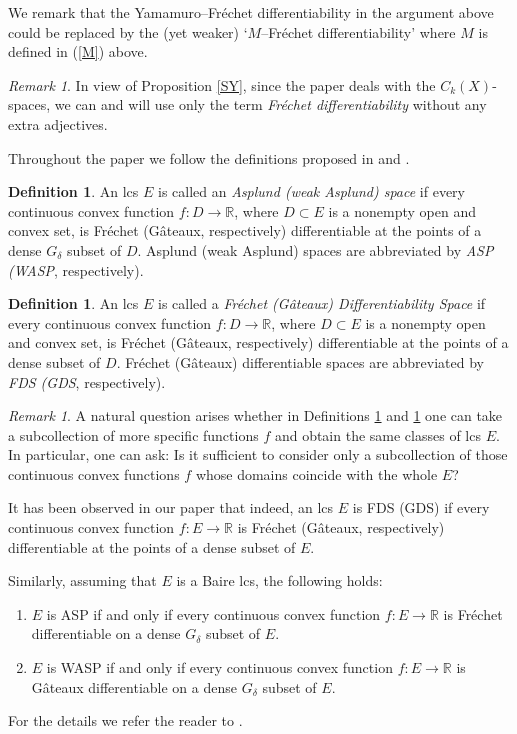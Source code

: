 \documentclass[12pt]{amsart}
\theoremstyle{plain}
\theoremstyle{definition}
\newtheorem{definition}[theorem]{Definition}
\theoremstyle{remark}
\newtheorem{remark}[theorem]{Remark}
\def\R{{\mathbb R}}
\begin{document}
\noindent We remark that the Yamamuro--Fr\'echet differentiability in the argument above could be replaced by the (yet weaker) `$M$--Fr\'echet differentiability'
where $M$ is defined in (\ref{M}) above.
\smallskip

\begin{remark}
In view of Proposition \ref{SY}, since the paper deals with the $C_k(X)$-spaces, we can and will use only the term
{\it Fr\'echet differentiability} without any extra adjectives.
\end{remark}

Throughout the paper we follow the definitions proposed in \cite{es} and \cite{s}.

\begin{definition}\label{def3}
An lcs $E$ is called an {\it Asplund (weak Asplund) space} if every continuous convex function $f: D \to \R$, where $D\subset E$ is a nonempty open and convex set,
is Fr\'echet (G\^ ateaux, respectively) differentiable at the points of a dense $G_{\delta}$ subset of $D$.
Asplund (weak Asplund) spaces are abbreviated by {\it ASP (WASP}, respectively).
\end{definition}

\begin{definition}\label{def4}
An lcs $E$ is called a {\it Fr\'echet (G\^ ateaux) Differentiability Space} if every continuous convex function $f: D \to \R$, where  $D\subset E$ is a nonempty open and convex set,
is Fr\'echet (G\^ ateaux, respectively) differentiable at the points of a dense subset of $D$.
Fr\'echet (G\^ ateaux) differentiable spaces are abbreviated by {\it FDS {\rm (}GDS}, respectively).
\end{definition}

\begin{remark}\label{notD}
A natural question arises whether in Definitions \ref{def3} and \ref{def4} one can take a subcollection of more specific functions $f$ and obtain the same classes of lcs $E$.
In particular, one can ask: Is it sufficient to consider only a subcollection of those continuous convex functions $f$ whose domains coincide with the whole $E$?

It has been observed in our paper \cite{KL3} that indeed, an lcs $E$ is FDS (GDS) if every continuous convex function $f: E \to \R$
is Fr\'echet (G\^ ateaux, respectively) differentiable at the points of a dense subset of $E$.

Similarly, assuming that $E$ is a Baire lcs, the following holds:
\begin{enumerate}
\item[{\rm (1)}] $E$ is ASP if and only if every continuous convex function $f: E \to \R$ is Fr\'echet differentiable on a dense $G_{\delta}$ subset of $E$.
\item[{\rm (2)}] $E$ is WASP if and only if every continuous convex function $f: E \to \R$ is G\^ ateaux differentiable on a dense $G_{\delta}$ subset of $E$.
\end{enumerate}
For the details we refer the reader to \cite[Propositions 1.7 and 1.9 ]{KL3}.
\end{remark}
\end{document}

